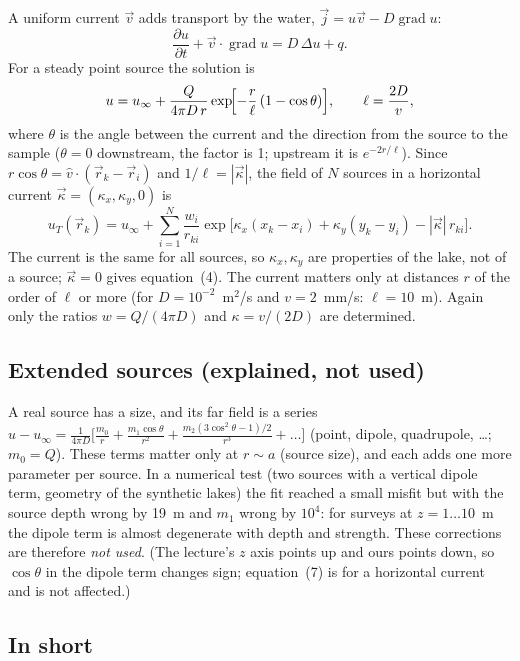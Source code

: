 \documentclass{article}
\begin{document}
A uniform current $\vec v$ adds transport by the water, $\vec j=u\vec v-D\operatorname{grad}u$:
\[
\frac{\partial u}{\partial t}+\vec v\cdot\operatorname{grad}u=D\,\Delta u+q .
\tag{6}
\]
For a steady point source the solution is
\[
u=u_\infty+\frac{Q}{4\pi D\,r}\exp\!\Bigl[-\frac{r}{\ell}\,(1-\cos\theta)\Bigr],\qquad
\ell=\frac{2D}{v},
\]
where $\theta$ is the angle between the current and the direction from the source
to the sample ($\theta=0$ downstream, the factor is 1; upstream it is $e^{-2r/\ell}$).
Since $r\cos\theta=\hat v\cdot(\vec r_k-\vec r_i)$ and $1/\ell=|\vec\kappa|$, the field
of $N$ sources in a horizontal current $\vec\kappa=(\kappa_x,\kappa_y,0)$ is
\begin{equation}
u_T(\vec r_k)=u_\infty+\sum_{i=1}^{N}\frac{w_i}{r_{ki}}
\exp\!\bigl[\kappa_x(x_k-x_i)+\kappa_y(y_k-y_i)-|\vec\kappa|\,r_{ki}\bigr].
\tag{7}
\end{equation}
The current is the same for all sources, so $\kappa_x,\kappa_y$ are properties of the
lake, not of a source; $\vec\kappa=0$ gives equation~(4). The current matters only at
distances $r$ of the order of $\ell$ or more (for $D=10^{-2}$~m$^2$/s and $v=2$~mm/s: $\ell=10$~m).
Again only the ratios $w=Q/(4\pi D)$ and $\kappa=v/(2D)$ are determined.

\subsection{Extended sources (explained, not used)}

A real source has a size, and its far field is a series
$u-u_\infty=\frac1{4\pi D}\bigl[\frac{m_0}{r}+\frac{m_1\cos\theta}{r^2}+
\frac{m_2(3\cos^2\theta-1)/2}{r^3}+\dots\bigr]$ (point, dipole, quadrupole, \dots;
$m_0=Q$). These terms matter only at $r\sim a$ (source size), and each adds one more
parameter per source. In a numerical test (two sources with a vertical dipole term,
geometry of the synthetic lakes) the fit reached a small misfit but with the source
depth wrong by 19~m and $m_1$ wrong by $10^4$: for surveys at $z=1\dots10$~m the dipole
term is almost degenerate with depth and strength. These corrections are therefore
\emph{not used}. (The lecture's $z$ axis points up and ours points down, so $\cos\theta$ in
the dipole term changes sign; equation~(7) is for a horizontal current and is not affected.)

\subsection{In short}
\end{document}
